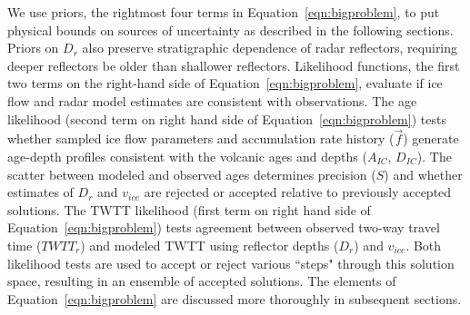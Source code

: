 We use priors, the rightmost four terms in Equation~\ref{eqn:bigproblem}, to put physical bounds on sources of uncertainty as described in the following sections. Priors on ${D_r}$ also preserve stratigraphic dependence of radar reflectors, requiring deeper reflectors be older than shallower reflectors. Likelihood functions, the first two terms on the right-hand side of Equation~\ref{eqn:bigproblem}, evaluate if ice flow and radar model estimates are consistent with observations. The age likelihood (second term on right hand side of Equation~\ref{eqn:bigproblem}) tests whether sampled ice flow parameters and accumulation rate history ($\vec{f}$) generate age-depth profiles consistent with the volcanic ages and depths ($A_{IC}$, $D_{IC}$). The scatter between modeled and observed ages determines precision ($S$) and whether estimates of $D_r$ and $v_{ice}$ are rejected or accepted relative to previously accepted solutions. The TWTT likelihood (first term on right hand side of Equation~\ref{eqn:bigproblem}) tests %
agreement between observed two-way travel time ($TWTT_r$) and modeled TWTT using reflector depths ($D_r$) and $v_{ice}$. Both likelihood tests are used to accept or reject various ``steps" through this solution space, resulting in an ensemble of accepted solutions. %
The elements of Equation~\ref{eqn:bigproblem} are discussed more thoroughly in subsequent sections. %

